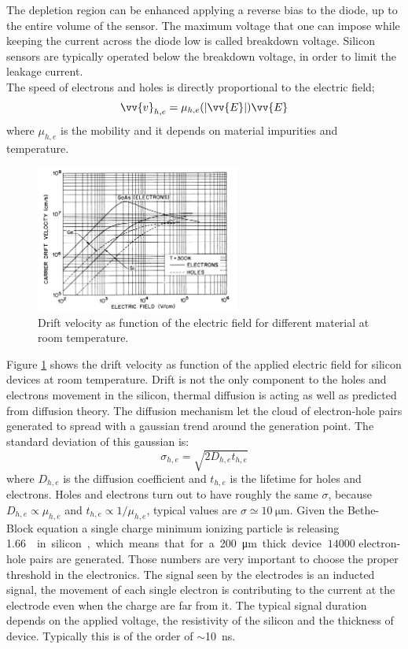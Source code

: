 The depletion region can be enhanced applying a reverse bias to the diode, up to the entire volume of the sensor. The maximum voltage that one can impose while keeping the current across the diode low is called breakdown voltage. Silicon sensors are typically operated below the breakdown voltage, in order to limit the leakage current.\\
The speed of electrons and holes is directly proportional to the electric field;
\begin{equation}
\vv{v}_{h,e} = \mu_{h,e}(\abs{\vv{E}}) \vv{E}
\end{equation}
where $\mu_{h,e}$ is the mobility and it depends on material impurities and temperature.
\begin{figure}
\center
\includegraphics[width=0.6\textwidth]{Images/tracking_det/mobility.png}
\caption{Drift velocity as function of the electric field for different material at room temperature.}
\label{pic:mobility}
\end{figure}
Figure \ref{pic:mobility} shows the drift velocity as function of the applied electric field for silicon devices at room temperature.
Drift is not the only component to the holes and electrons movement in the silicon, thermal diffusion is acting as well as predicted from diffusion theory. The diffusion mechanism let the cloud of electron-hole pairs generated to spread with a gaussian trend around the generation point. The standard deviation of this gaussian is:
\begin{equation}
\sigma_{h,e} = \sqrt{2D_{h,e}t_{h,e}}
\end{equation}
where $D_{h,e}$ is the diffusion coefficient and $t_{h,e}$ is the lifetime for holes and electrons. Holes and electrons turn out to have roughly the same $\sigma$, because $D_{h,e}\propto \mu_{h,e}$ and $t_{h,e}\propto 1/\mu_{h,e}$, typical values are $\sigma \simeq \SI{10}{\micro\meter}$.
Given the Bethe-Block equation a single charge minimum ionizing particle is releasing \SI{1.66}{\MeV \square{\centi\meter}\per{\gram}} in silicon, which means that for a \SI{200}{\micro\meter} thick device $~14000$ electron-hole pairs are generated. Those numbers are very important to choose the proper threshold in the electronics.
The signal seen by the electrodes is an inducted signal, the movement of each single electron is contributing to the current at the electrode even when the charge are far from it. The typical signal duration depends on the applied voltage, the resistivity of the silicon and the thickness of device. Typically this is of the order of $\sim$\SI{10}{\nano\second}.

